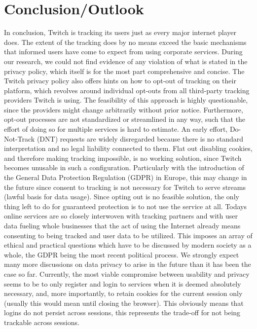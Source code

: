 \section{Conclusion/Outlook}
In conclusion, Twitch is tracking its users just as every major internet player does.
The extent of the tracking does by no means exceed the basic mechanisms that informed users have come to expect from using corporate services.
During our research, we could not find evidence of any violation of what is stated in the privacy policy, which itself is for the most part comprehensive and concise.
The Twitch privacy policy also offers hints on how to opt-out of tracking on their platform,
which revolves around individual opt-outs from all third-party tracking providers Twitch is using.
The feasibility of this approach is highly questionable, since the providers might change arbitrarily without prior notice.
Furthermore, opt-out processes are not standardized or streamlined in any way, such that the effort of doing so for multiple services is hard to estimate.
An early effort, Do-Not-Track (DNT) requests are widely disregarded because there is no standard interpretation and no legal liability connected to them.
Flat out disabling cookies, and therefore making tracking impossible, is no working solution, since Twitch becomes unusable in such a configuration.
Particularly with the introduction of the General Data Protection Regulation (GDPR) in Europe,
this may change in the future since consent to tracking is not necessary for Twitch to serve streams (lawful basis for data usage).
Since opting out is no feasible solution, the only thing left to do for guaranteed protection is to not use the service at all.
Todays online services are so closely interwoven with tracking partners and with user data fueling whole businesses that
the act of using the Internet already means consenting to being tracked and user data to be utilized.
This imposes an array of ethical and practical questions which have to be discussed by modern society as a whole,
the GDPR being the most recent political process. We strongly expect many more discussions on data privacy to arise in the future than it has been the case so far.
Currently, the most viable compromise between usability and privacy seems to be to only register and login to services when it is deemed absolutely necessary, and,
more importantly, to retain cookies for the current session only (usually this would mean until closing the browser).
This obviously means that logins do not persist across sessions, this represents the trade-off for not being trackable across sessions.
